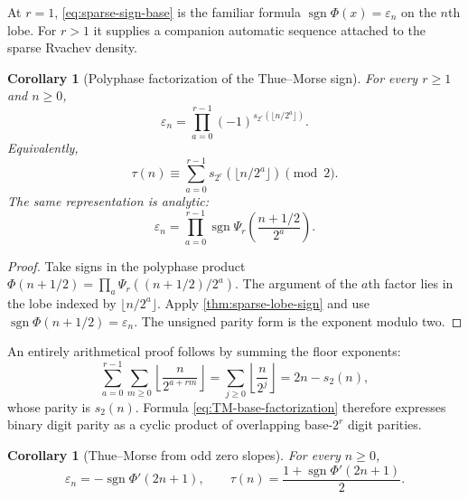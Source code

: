 \documentclass[11pt,oneside]{article}
\numberwithin{equation}{section}
\newtheorem{corollary}[theorem]{Corollary}
\theoremstyle{definition}
\theoremstyle{remark}
\newcommand{\sgn}{\operatorname{sgn}}
\newcommand{\eps}{\varepsilon}
\begin{document}
At $r=1$, \eqref{eq:sparse-sign-base} is the familiar formula
$\sgn\Phi(x)=\eps_n$ on the $n$th lobe.  For $r>1$ it supplies a companion
automatic sequence attached to the sparse Rvachev density.

\begin{corollary}[Polyphase factorization of the Thue--Morse sign]
\label{cor:TM-base-factorization}
For every $r\ge1$ and $n\ge0$,
\begin{equation}
 \boxed{\displaystyle
 \eps_n
 =\prod_{a=0}^{r-1}(-1)^{s_{2^r}(\lfloor n/2^a\rfloor)}.} \label{eq:TM-base-factorization}
\end{equation}
Equivalently,
\begin{equation}
 \boxed{\displaystyle
 \tau(n)\equiv
 \sum_{a=0}^{r-1}s_{2^r}(\lfloor n/2^a\rfloor)\pmod2.}   \label{eq:TM-base-parity}
\end{equation}
The same representation is analytic:
\begin{equation}
 \eps_n
 =\prod_{a=0}^{r-1}
   \sgn\Psi_r\!\left(\frac{n+1/2}{2^a}\right).           \label{eq:TM-sparse-lobe-product}
\end{equation}
\end{corollary}

\begin{proof}
Take signs in the polyphase product
$\Phi(n+1/2)=\prod_a\Psi_r((n+1/2)/2^a)$.  The argument of the $a$th factor
lies in the lobe indexed by $\lfloor n/2^a\rfloor$.  Apply
\cref{thm:sparse-lobe-sign} and use
$\sgn\Phi(n+1/2)=\eps_n$.  The unsigned parity form is the exponent modulo two.
\end{proof}

An entirely arithmetical proof follows by summing the floor exponents:
\begin{equation}
 \sum_{a=0}^{r-1}\sum_{m\ge0}
 \left\lfloor\frac{n}{2^{a+rm}}\right\rfloor
 =\sum_{j\ge0}\left\lfloor\frac{n}{2^j}\right\rfloor
 =2n-s_2(n),                                               \label{eq:floor-polyphase-TM}
\end{equation}
whose parity is $s_2(n)$.  Formula
\eqref{eq:TM-base-factorization} therefore expresses binary digit parity as a
cyclic product of overlapping base-$2^r$ digit parities.

\begin{corollary}[Thue--Morse from odd zero slopes]
\label{cor:TM-zero-slopes}
For every $n\ge0$,
\begin{equation}
 \boxed{\displaystyle
 \eps_n=-\sgn\Phi'(2n+1),
 \qquad
 \tau(n)=\frac{1+\sgn\Phi'(2n+1)}2.}                      \label{eq:TM-zero-slope-sign}
\end{equation}
\end{corollary}
\end{document}
